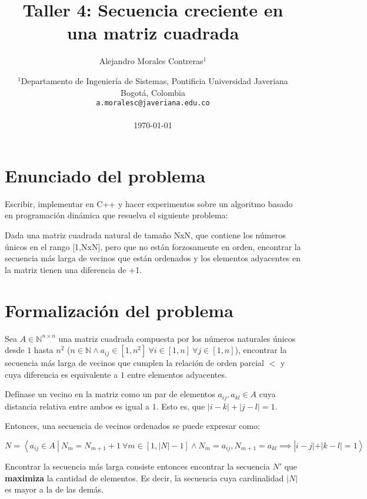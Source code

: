 \documentclass[letter]{article}
\title{Taller 4: Secuencia creciente en una matriz cuadrada}
\author{Alejandro Morales Contreras$^1$}
\date{
	$^1$Departamento de Ingeniería de Sistemas, Pontificia Universidad Javeriana\\Bogotá,  Colombia \\
	\texttt{a.moralesc@javeriana.edu.co}\\~\\
	{\AdvanceDate[+1]\today}
}
\begin{document}
\maketitle

\tableofcontents

\section{Enunciado del problema} \label{enunciado}

Escribir, implementar en C++ y hacer experimentos sobre un algoritmo basado en programación dinámica que resuelva el siguiente problema: \par

Dada una matriz cuadrada natural de tamaño NxN, que contiene los números únicos en el rango [1,NxN], pero que no están forzosamente en orden, encontrar la secuencia más larga de vecinos que están ordenados y los elementos adyacentes en la matriz tienen una diferencia de +1. \par

\section{Formalización del problema} \label{formalizacion}

Sea $A \in \mathbb{N}^{n \times n}$ una matriz cuadrada compuesta por los números naturales únicos desde $1$ hasta $n^2$ ($n \in \mathbb{N} \land a_{ij} \in [1, n^2] ~ \forall i \in [1, n] ~ \forall j \in [1, n]$), encontrar la secuencia más larga de vecinos que cumplen la relación de orden parcial $<$ y cuya diferencia es equivalente a $1$ entre elementos adyacentes. \par

Defínase un vecino en la matriz como un par de elementos $a_{ij}, a_{kl} \in A$ cuya distancia relativa entre ambos es igual a $1$. Esto es, que $| i - k | + | j - l | = 1$. \par

Entonces, una secuencia de vecinos ordenados se puede expresar como: \par

\vspace{-1em}

\[ N = \left< a_{ij} \in A ~ | ~ N_m = N_{m+1} + 1 ~ \forall m \in [1, |N| - 1] \land N_m = a_{ij}, N_{m+1} = a_{kl} \implies | i - j | + | k - l | = 1 \right> \]

Encontrar la secuencia más larga consiste entonces encontrar la secuencia $N'$ que \textbf{maximiza} la cantidad de elementos. Es decir, la secuencia cuya cardinalidad $|N|$ es mayor a la de las demás. \par
\end{document}
